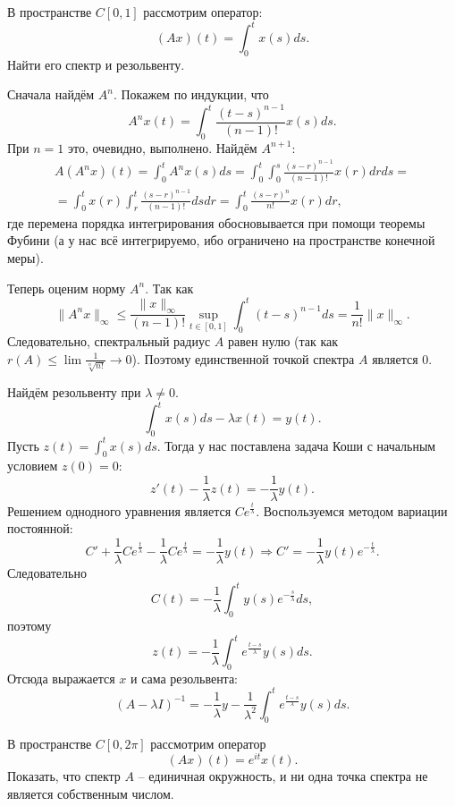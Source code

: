 \begin{task}[7.7]
    В пространстве $C[0, 1]$ рассмотрим оператор:
    \[
        (Ax)(t) = \int_0^{t} x(s)ds.
    \]
    Найти его спектр и резольвенту.
\end{task}
\begin{solution}
    Сначала найдём $A^n$.
    Покажем по индукции, что
    \[
        A^n x(t) = \int_0^t \frac{(t - s)^{n - 1}}{(n - 1)!}x(s)ds.
    \]
    При $n = 1$ это, очевидно, выполнено.
    Найдём $A^{n + 1}\colon$
    \begin{multline*}
        A(A^n x)(t) = \int_0^t A^n x(s)ds = \int_0^t \int_0^s \frac{(s - r)^{n - 1}}{(n - 1)!}x(r)drds = \\ = \int_0^t x(r) \int_r^t \frac{(s - r)^{n - 1}}{(n - 1)!}dsdr = \int_0^t \frac{(s - r)^n}{n!}x(r)dr,
    \end{multline*}
    где перемена порядка интегрирования обосновывается при помощи теоремы Фубини (а у нас всё интегрируемо, ибо ограничено на пространстве конечной меры).

    Теперь оценим норму $A^n$.
    Так как
    \[
        \|A^n x\|_\infty \leq \frac{\|x\|_\infty}{(n - 1)!} \sup_{t \in [0, 1]} \int_0^t (t - s)^{n - 1}ds = \frac{1}{n!}\|x\|_\infty.
    \]
    Следовательно, спектральный радиус $A$ равен нулю (так как $r(A) \leq \lim \frac{1}{\sqrt[n]{n!}} \rightarrow 0$). Поэтому единственной точкой спектра $A$ является $0$.

    Найдём резольвенту при $\lambda \neq 0$.
    \[
        \int_0^t x(s)ds - \lambda x(t) = y(t).
    \]
    Пусть $z(t) = \int_0^t x(s)ds$.
    Тогда у нас поставлена задача Коши с начальным условием $z(0) = 0\colon$
    \[
        z'(t) - \frac{1}{\lambda}z(t) = -\frac{1}{\lambda}y(t).
    \]
    Решением однодного уравнения является $C e^{\frac{t}{\lambda}}$.
    Воспользуемся методом вариации постоянной:
    \[
        C' + \frac{1}{\lambda}Ce^{\frac{t}{\lambda}} - \frac{1}{\lambda}Ce^{\frac{t}{\lambda}} = -\frac{1}{\lambda}y(t) \Rightarrow C' = -\frac{1}{\lambda}y(t)e^{-\frac{t}{\lambda}}.
    \]
    Следовательно
    \[
        C(t) =  -\frac{1}{\lambda}\int_0^{t} y(s) e^{-\frac{s}{\lambda}}ds,
    \]
    поэтому 
    \[
        z(t) = -\frac{1}{\lambda}\int_{0}^t e^{\frac{t - s}{\lambda}}y(s)ds.
    \]
    Отсюда выражается $x$ и сама резольвента:
    \[
        (A - \lambda I)^{-1} = -\frac{1}{\lambda}y - \frac{1}{\lambda^2}\int_0^t e^{\frac{t - s}{\lambda}}y(s)ds.
    \]
\end{solution}
\begin{task}[7.11]
    В пространстве $C[0, 2\pi]$ рассмотрим оператор
    \[
        (Ax)(t) = e^{it}x(t).
    \]
    Показать, что спектр $A$ -- единичная окружность, и ни одна точка спектра не является собственным числом.
\end{task}

